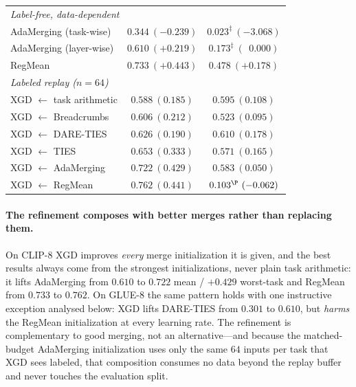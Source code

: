 \documentclass{article} %
\begin{document}
\begin{table}[t]
\begin{tabular}{lcc}
\midrule
\multicolumn{3}{l}{\emph{Label-free, data-dependent}}\\
AdaMerging (task-wise)                    & $0.344\ (-0.239)$          & $0.023^\ddagger\ (-3.068)$ \\
AdaMerging (layer-wise)                   & $0.610\ (+0.219)$          & $0.173^\ddagger\ (\ \ 0.000)$ \\
RegMean                                   & $0.733\ (+0.443)$          & $0.478\ (+0.178)$ \\
\midrule
\multicolumn{3}{l}{\emph{Labeled replay ($n=64$)}}\\
XGD $\leftarrow$ task arithmetic          & $0.588\ (0.185)$           & $0.595\ (0.108)$ \\
XGD $\leftarrow$ Breadcrumbs              & $0.606\ (0.212)$           & $0.523\ (0.095)$ \\
XGD $\leftarrow$ DARE-TIES                & $0.626\ (0.190)$           & $\mathbf{0.610}\ (\mathbf{0.178})$ \\
XGD $\leftarrow$ TIES                     & $0.653\ (0.333)$           & $0.571\ (0.165)$ \\
XGD $\leftarrow$ AdaMerging               & $\mathbf{0.722}\ (\mathbf{0.429})$ & $0.583\ (0.050)$ \\
XGD $\leftarrow$ RegMean                  & $0.762\ (0.441)$           & $0.103^\P\ (-0.062)$ \\
\bottomrule
\end{tabular}
\end{table}

\paragraph{The refinement composes with better merges rather than replacing them.}
On CLIP-8 XGD improves \emph{every} merge initialization it is given, and the best results always come from the strongest initializations, never plain task arithmetic: it lifts AdaMerging from $0.610$ to $\mathbf{0.722}$ mean / $\mathbf{+0.429}$ worst-task and RegMean from $0.733$ to $0.762$. On GLUE-8 the same pattern holds with one instructive exception analysed below: XGD lifts DARE-TIES from $0.301$ to $0.610$, but \emph{harms} the RegMean initialization at every learning rate. The refinement is complementary to good merging, not an alternative---and because the matched-budget AdaMerging initialization uses only the same $64$ inputs per task that XGD sees labeled, that composition consumes no data beyond the replay buffer and never touches the evaluation split.
\end{document}
